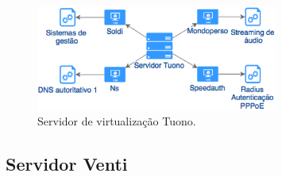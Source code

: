\begin{figure}[h!]
 \centering
 \includegraphics[width=300px]{img/servidor_tuono.eps}
 \caption{Servidor de virtualização Tuono.}
 \label{fig:servidor_tuono}
\end{figure}

\subsection{Servidor Venti}
\label{section:serv_venti}

